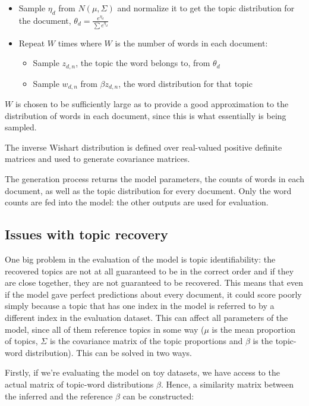 \documentclass[12pt,a4paper,twoside,openright]{report}
\begin{document}
\begin{itemize}[noitemsep]
\item Sample $\eta_d$ from $N(\mu, \Sigma)$ and normalize it to get the topic distribution for the document, $\theta_d = \frac{e^{\eta_d}}{\sum{e^{\eta_d}}}$
\item Repeat $W$ times where $W$ is the number of words in each document:
\begin{itemize}[noitemsep]
\item Sample $z_{d, n}$, the topic the word belongs to, from $\theta_d$
\item Sample $w_{d, n}$ from $\beta{z_{d, n}}$, the word distribution for that topic
\end{itemize}
\end{itemize}

$W$ is chosen to be sufficiently large as to provide a good approximation to the distribution of words in each document, since this is what essentially is being sampled.

The inverse Wishart distribution is defined over real-valued positive definite matrices and used to generate covariance matrices.

The generation process returns the model parameters, the counts of words in each document, as well as the topic distribution for every document. Only the word counts are fed into the model: the other outputs are used for evaluation.

\subsection{Issues with topic recovery}

One big problem in the evaluation of the model is topic identifiability: the recovered topics are not at all guaranteed to be in the correct order and if they are close together, they are not guaranteed to be recovered. This means that even if the model gave perfect predictions about every document, it could score poorly simply because a topic that has one index in the model is referred to by a different index in the evaluation dataset. This can affect all parameters of the model, since all of them reference topics in some way ($\mu$ is the mean proportion of topics, $\Sigma$ is the covariance matrix of the topic proportions and $\beta$ is the topic-word distribution). This can be solved in two ways.

Firstly, if we're evaluating the model on toy datasets, we have access to the actual matrix of topic-word distributions $\beta$. Hence, a similarity matrix between the inferred and the reference $\beta$ can be constructed:
\end{document}
